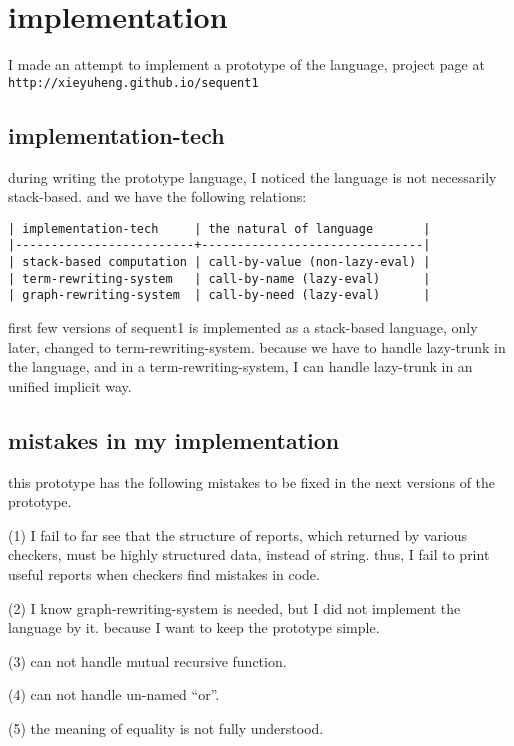 \documentclass{sigplanconf}
\begin{document}
\section{implementation}

I made an attempt to implement a prototype of the language,
project page at {\scriptsize\verb|http://xieyuheng.github.io/sequent1|}

\subsection{implementation-tech}

during writing the prototype language,
I noticed the language is not necessarily stack-based.
and we have the following relations:

{\scriptsize\begin{verbatim}
| implementation-tech     | the natural of language       |
|-------------------------+-------------------------------|
| stack-based computation | call-by-value (non-lazy-eval) |
| term-rewriting-system   | call-by-name (lazy-eval)      |
| graph-rewriting-system  | call-by-need (lazy-eval)      |
\end{verbatim}}

first few versions of sequent1 is implemented as a stack-based language,
only later, changed to term-rewriting-system.
because we have to handle lazy-trunk in the language,
and in a term-rewriting-system,
I can handle lazy-trunk in an unified implicit way.

\subsection{mistakes in my implementation}

this prototype has the following mistakes
to be fixed in the next versions of the prototype.

(1) I fail to far see that
the structure of reports, which returned by various checkers,
must be highly structured data, instead of string.
thus, I fail to print useful reports when checkers find mistakes in code.

(2) I know graph-rewriting-system is needed,
but I did not implement the language by it.
because I want to keep the prototype simple.

(3) can not handle mutual recursive function.

(4) can not handle un-named ``or''.

(5) the meaning of equality is not fully understood.
\end{document}

